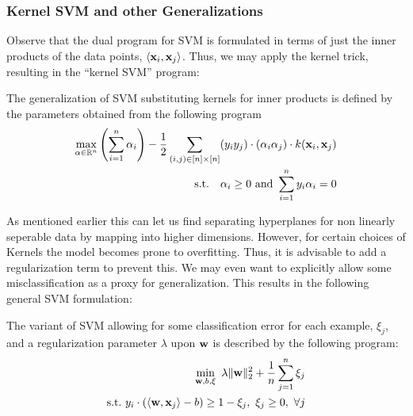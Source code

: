 \subsubsection{Kernel SVM and other Generalizations}
    Observe that the dual program for SVM is formulated in terms of just the inner products of the data points, $\langle \mathbf{x}_i, \mathbf{x}_j \rangle$. Thus,
    we may apply the kernel trick, resulting in the ``kernel SVM'' program:
    \begin{defn}
        The generalization of SVM substituting kernels for inner products is defined by the parameters obtained from the following program
        \begin{align*}
            \max_{\alpha \in \mathbb{R}^n} \left( \sum_{i= 1}^n \alpha_i \right) - \frac{1}{2} \sum_{(i,j) \in [n] \times [n]} (y_i y_j) \cdot (\alpha_i \alpha_j) \cdot k(\mathbf{x}_i, \mathbf{x}_j) \\
            \text{s.t.} \quad \alpha_i \geq 0 \ \text{and} \ \sum_{i = 1}^n y_i \alpha_i = 0
        \end{align*}
    \end{defn}
    
    As mentioned earlier this can let us find separating hyperplanes for non linearly seperable data by mapping into higher dimensions.
    However, for certain choices of Kernels the model becomes prone to overfitting. Thus, it is advisable to add a regularization term
    to prevent this. We may even want to explicitly allow some misclassification as a proxy for generalization. This results in the following
    general SVM formulation:
    \begin{defn}
        The variant of SVM allowing for some classification error for each example, $\xi_j$, and a regularization parameter $\lambda$ upon $\mathbf{w}$
        is described by the following program:
        \begin{align*}
            \min_{\mathbf{w}, b,\xi} \  \lambda \lVert \mathbf{w} \rVert_2^2 + \frac{1}{n} \sum_{j = 1}^n \xi_j \\
            \text{s.t.} \  y_i \cdot \left( \langle \mathbf{w}, \mathbf{x}_j \rangle - b\right) \geq 1 - \xi_j, \  \xi_j \geq 0, \  \forall j
        \end{align*}
    \end{defn}
    